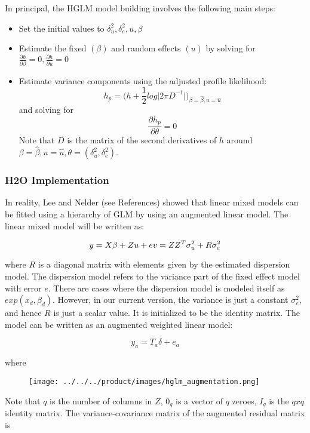 In principal, the HGLM model building involves the following main steps:

\begin{itemize}
    \item Set the initial values to $\delta_u^2, \delta_e^2, u, \beta$
    \item Estimate the fixed $(\beta)$ and random effects $(u)$ by solving for $\frac{\partial h}{\partial \beta} = 0, \frac{\partial h}{\partial u} = 0$
    \item Estimate variance components using the adjusted profile likelihood:
        $$h_p = \big(h + \frac{1}{2} log \big| 2 \pi D^{-1}\big| \big)_{\beta=\hat \beta, u=\hat u}$$
        and solving for
        $$\frac{\partial h_p}{\partial \theta} = 0$$
        Note that $D$ is the matrix of the second derivatives of $h$ around $\beta = \hat \beta, u = \hat u, \theta = (\delta_u^2, \delta_e^2)$.  
\end{itemize}

\subsubsection{H2O Implementation}

In reality, Lee and Nelder (see References) showed that linear mixed models can be fitted using a hierarchy of GLM by using an augmented linear model. The linear mixed model will be written as:

$$y = X\beta + Zu + e \\
v = ZZ^T\sigma_u^2 + R\sigma_e^2$$

where $R$ is a diagonal matrix with elements given by the estimated dispersion model. The dispersion model refers to the variance part of the fixed effect model with error $e$. There are cases where the dispersion model is modeled itself as $exp(x_d, \beta_d)$. However, in our current version, the variance is just a constant $\sigma_e^2$, and hence $R$ is just a scalar value. It is initialized to be the identity matrix. The model can be written as an augmented weighted linear model:

$$y_a = T_a \delta + e_a$$

where

\begin{figure}[H]
\centering
\texttt{[image: ../../../product/images/hglm\_augmentation.png]}
\end{figure}

Note that $q$ is the number of columns in $Z$, $0_q$ is a vector of $q$ zeroes, $I_q$ is the $qxq$ identity matrix. The variance-covariance matrix of the augmented residual matrix is

